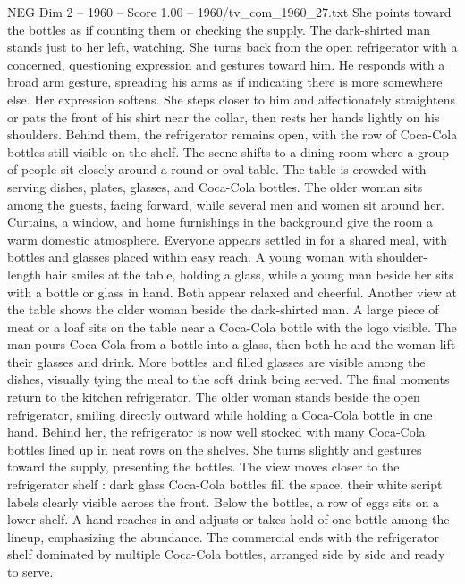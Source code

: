 \begin{textsample}{NEG Dim 2 – 1960 – Score 1.00 – 1960/tv\_com\_1960\_27.txt}
She points toward the bottles as if counting them or checking the supply.
The dark-shirted man stands just to her left, watching.
She turns back from the open refrigerator with a concerned, questioning expression and gestures toward him.
He responds with a broad arm gesture, spreading his arms as if indicating there is more somewhere else.
Her expression softens.
She steps closer to him and affectionately straightens or pats the front of his shirt near the collar, then rests her hands lightly on his shoulders.
Behind them, the refrigerator remains open, with the row of Coca-Cola bottles still visible on the shelf.
The scene shifts to a dining room where a group of people sit closely around a round or oval table.
The table is crowded with serving dishes, plates, glasses, and Coca-Cola bottles.
The older woman sits among the guests, facing forward, while several men and women sit around her.
Curtains, a window, and home furnishings in the background give the room a warm domestic atmosphere.
Everyone appears settled in for a shared meal, with bottles and glasses placed within easy reach.
A young woman with shoulder-length hair smiles at the table, holding a glass, while a young man beside her sits with a bottle or glass in hand.
Both appear relaxed and cheerful.
Another view at the table shows the older woman beside the dark-shirted man.
A large piece of meat or a loaf sits on the table near a Coca-Cola bottle with the logo visible.
The man pours Coca-Cola from a bottle into a glass, then both he and the woman lift their glasses and drink.
More bottles and filled glasses are visible among the dishes, visually tying the meal to the soft drink being served.
The final moments return to the kitchen refrigerator.
The older woman stands beside the open refrigerator, smiling directly outward while holding a Coca-Cola bottle in one hand.
Behind her, the refrigerator is now well stocked with many Coca-Cola bottles lined up in neat rows on the shelves.
She turns slightly and gestures toward the supply, presenting the bottles.
The view moves closer to the refrigerator shelf : dark glass Coca-Cola bottles fill the space, their white script labels clearly visible across the front.
Below the bottles, a row of eggs sits on a lower shelf.
A hand reaches in and adjusts or takes hold of one bottle among the lineup, emphasizing the abundance.
The commercial ends with the refrigerator shelf dominated by multiple Coca-Cola bottles, arranged side by side and ready to serve.

\end{textsample}
